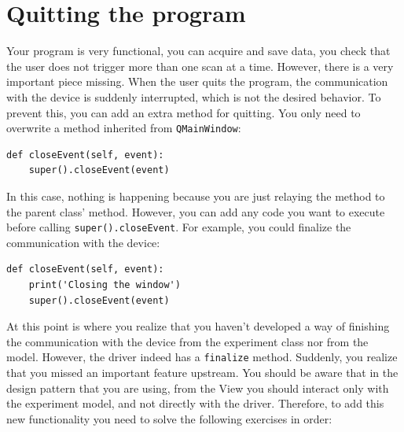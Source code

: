 \section{Quitting the program}\label{quitting-theprogram}
Your program is very functional, you can acquire and save data, you
check that the user does not trigger more than one scan at a time.
However, there is a very important piece missing. When the user quits
the program, the communication with the device is suddenly interrupted,
which is not the desired behavior. To prevent this, you can add an extra
method for quitting. You only need to overwrite a method inherited from
\texttt{QMainWindow}:

\begin{verbatim}
def closeEvent(self, event):
    super().closeEvent(event)
\end{verbatim}

In this case, nothing is happening because you are just relaying the
method to the parent class' method. However, you can add any code you
want to execute before calling \texttt{super().closeEvent}. For example,
you could finalize the communication with the device:

\begin{verbatim}
def closeEvent(self, event):
    print('Closing the window')
    super().closeEvent(event)
\end{verbatim}

At this point is where you realize that you haven't developed a way of
finishing the communication with the device from the experiment class
nor from the model. However, the driver indeed has a \texttt{finalize}
method. Suddenly, you realize that you missed an important feature
upstream. You should be aware that in the design pattern that you are
using, from the View you should interact only with the experiment model,
and not directly with the driver. Therefore, to add this new
functionality you need to solve the following exercises in order:




